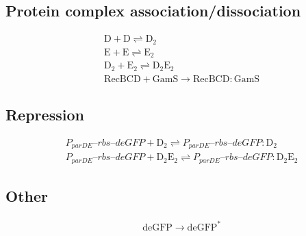 \documentclass[english]{report}
\begin{document}
\subsection{Protein complex association/dissociation}

\begin{align}
& \mathrm{D} + \mathrm{D} \rightleftharpoons \mathrm{D_2} \\
& \mathrm{E} + \mathrm{E} \rightleftharpoons \mathrm{E_2} \\
& \mathrm{D_2} + \mathrm{E_2} \rightleftharpoons \mathrm{D_2E_2} \\
& \mathrm{RecBCD} + \mathrm{GamS} \rightarrow \mathrm{RecBCD}\!:\!\mathrm{GamS} 
\end{align}

\subsection{Repression}

\begin{align}
& P_{parDE}\textrm{--}rbs\textrm{--}deGFP + \mathrm{D_2} \rightleftharpoons P_{parDE}\textrm{--}rbs\textrm{--}deGFP\!:\!\mathrm{D_2} \\
& P_{parDE}\textrm{--}rbs\textrm{--}deGFP + \mathrm{D_2E_2} \rightleftharpoons P_{parDE}\textrm{--}rbs\textrm{--}deGFP\!:\!\mathrm{D_2E_2}
\end{align}

\subsection{Other}

\begin{align}
& \mathrm{deGFP} \rightarrow \mathrm{deGFP^*}
\end{align}
\end{document}
